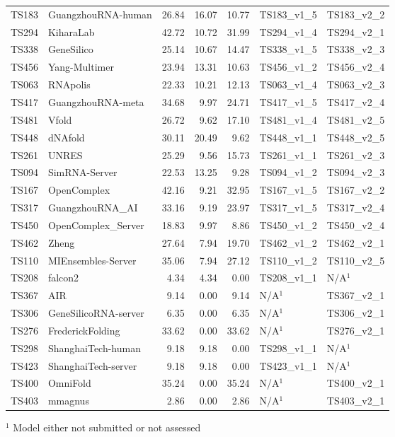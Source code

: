 \begin{table}[ht]
{\begin{tabular}{llrrrll}
TS183 & GuangzhouRNA-human & 26.84 & 16.07 & 10.77 & TS183\_v1\_5 & TS183\_v2\_2 \\ 
TS294 & KiharaLab & 42.72 & 10.72 & 31.99 & TS294\_v1\_4 & TS294\_v2\_1 \\ 
TS338 & GeneSilico & 25.14 & 10.67 & 14.47 & TS338\_v1\_5 & TS338\_v2\_3 \\ 
TS456 & Yang-Multimer & 23.94 & 13.31 & 10.63 & TS456\_v1\_2 & TS456\_v2\_4 \\ 
TS063 & RNApolis & 22.33 & 10.21 & 12.13 & TS063\_v1\_4 & TS063\_v2\_3 \\ 
TS417 & GuangzhouRNA-meta & 34.68 & 9.97 & 24.71 & TS417\_v1\_5 & TS417\_v2\_4 \\ 
TS481 & Vfold & 26.72 & 9.62 & 17.10 & TS481\_v1\_4 & TS481\_v2\_5 \\ 
TS448 & dNAfold & 30.11 & 20.49 & 9.62 & TS448\_v1\_1 & TS448\_v2\_5 \\ 
TS261 & UNRES & 25.29 & 9.56 & 15.73 & TS261\_v1\_1 & TS261\_v2\_3 \\ 
TS094 & SimRNA-Server & 22.53 & 13.25 & 9.28 & TS094\_v1\_2 & TS094\_v2\_3 \\ 
TS167 & OpenComplex & 42.16 & 9.21 & 32.95 & TS167\_v1\_5 & TS167\_v2\_2 \\ 
TS317 & GuangzhouRNA\_AI & 33.16 & 9.19 & 23.97 & TS317\_v1\_5 & TS317\_v2\_4 \\ 
TS450 & OpenComplex\_Server & 18.83 & 9.97 & 8.86 & TS450\_v1\_2 & TS450\_v2\_4 \\ 
TS462 & Zheng & 27.64 & 7.94 & 19.70 & TS462\_v1\_2 & TS462\_v2\_1 \\ 
TS110 & MIEnsembles-Server & 35.06 & 7.94 & 27.12 & TS110\_v1\_2 & TS110\_v2\_5 \\ 
TS208 & falcon2 & 4.34 & 4.34 & 0.00 & TS208\_v1\_1 & N/A$^{1}$ \\ 
TS367 & AIR & 9.14 & 0.00 & 9.14 & N/A$^{1}$ & TS367\_v2\_1 \\ 
TS306 & GeneSilicoRNA-server & 6.35 & 0.00 & 6.35 & N/A$^{1}$ & TS306\_v2\_1 \\ 
TS276 & FrederickFolding & 33.62 & 0.00 & 33.62 & N/A$^{1}$ & TS276\_v2\_1 \\ 
TS298 & ShanghaiTech-human & 9.18 & 9.18 & 0.00 & TS298\_v1\_1 & N/A$^{1}$ \\ 
TS423 & ShanghaiTech-server & 9.18 & 9.18 & 0.00 & TS423\_v1\_1 & N/A$^{1}$ \\ 
TS400 & OmniFold & 35.24 & 0.00 & 35.24 & N/A$^{1}$ & TS400\_v2\_1 \\ 
TS403 & mmagnus & 2.86 & 0.00 & 2.86 & N/A$^{1}$ & TS403\_v2\_1 \\ 
\bottomrule
\end{tabular}%
}
\begin{flushleft}\footnotesize $^{1}$ Model either not submitted or not assessed\end{flushleft}
\end{table}
